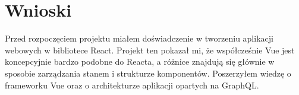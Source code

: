 \documentclass{article}
\begin{document}
    \section{Wnioski}
        Przed rozpoczęciem projektu miałem doświadczenie w tworzeniu aplikacji webowych w bibliotece React.
        Projekt ten pokazał mi, że współcześnie Vue jest koncepcyjnie bardzo podobne do Reacta, a różnice znajdują się głównie w sposobie zarządzania stanem i strukturze komponentów.
        Poszerzyłem wiedzę o frameworku Vue oraz o architekturze aplikacji opartych na GraphQL.
\end{document}
